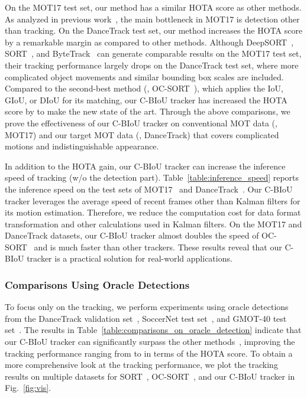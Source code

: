 \documentclass[journal]{IEEEtran}
\begin{document}
On the MOT17 test set, our method has a similar HOTA score as other methods. As analyzed in previous work~\cite{sun2022dancetrack}, the main bottleneck in MOT17 is detection other than tracking. On the DanceTrack test set, our method increases the HOTA score by a remarkable margin as compared to other methods. Although DeepSORT~\cite{DeepSORT}, SORT~\cite{SORT}, and ByteTrack~\cite{bytetrack} can generate comparable results on the MOT17 test set, their tracking performance largely drops on the DanceTrack test set, where more complicated object movements and similar bounding box scales are included.
Compared to the second-best method (\ie, OC-SORT~\cite{cao2022observation}), which applies the IoU, GIoU,  or DIoU for its matching, our C-BIoU tracker has increased the HOTA score by  to make the new state of the art. Through the above comparisons, we prove the effectiveness of our C-BIoU tracker on conventional MOT data (\ie, MOT17) and our target MOT data (\ie, DanceTrack) that covers complicated motions and indistinguishable appearance.


In addition to the HOTA gain, our C-BIoU tracker can increase the inference speed of tracking (w/o the detection part). Table~\ref{table:inference_speed} reports the inference speed on the test sets of MOT17~\cite{MOT16} and DanceTrack~\cite{sun2022dancetrack}. Our C-BIoU tracker leverages the average speed of recent frames other than Kalman filters for its motion estimation. Therefore, we reduce the computation cost for data format transformation and other calculations used in Kalman filters. On the MOT17 and DanceTrack datasets, our C-BIoU tracker almost doubles the speed of OC-SORT~\cite{cao2022observation} and is much faster than other trackers. These results reveal that our C-BIoU tracker is a practical solution for real-world applications.



\subsubsection{Comparisons Using Oracle Detections}


To focus only on the tracking, we perform experiments using oracle detections from the DanceTrack validation set~\cite{sun2022dancetrack}, SoccerNet test set~\cite{cioppa2022soccernet,deliege2021soccernet}, and GMOT-40 test set~\cite{bai2021gmot}. The results in Table~\ref{table:comparisons_on_oracle_detection} indicate that our C-BIoU tracker can significantly surpass the other methods~\cite{SORT, DeepSORT, bytetrack, sun2022dancetrack, cao2022observation}, improving the tracking performance ranging from  to  in terms of the HOTA score. To obtain a more comprehensive look at the tracking performance, we plot the tracking results on multiple datasets for SORT~\cite{SORT}, OC-SORT~\cite{cao2022observation}, and our C-BIoU tracker in Fig.~\ref{fig:vis}.
\end{document}
